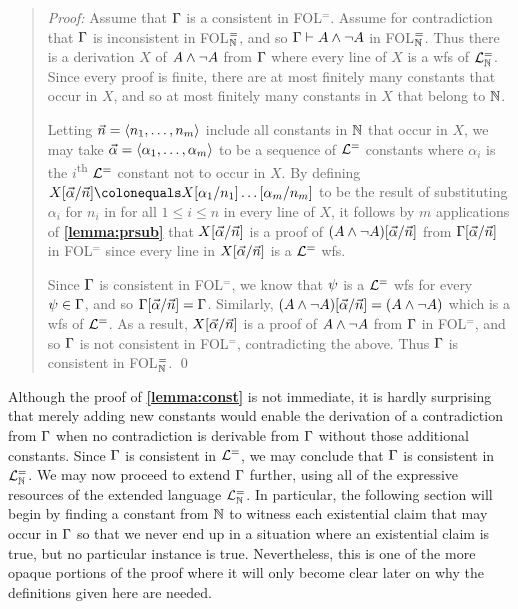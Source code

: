 \begin{quote} 
  \textit{Proof:} Assume that $\Gamma$ is a consistent in FOL$^=$.
  Assume for contradiction that $\Gamma$ is inconsistent in FOL$^=_{\mathbb{N}}$, and so $\Gamma\vdash A\wedge\neg A$ in FOL$^=_{\mathbb{N}}$.
  Thus there is a derivation $X$ of $A\wedge\neg A$ from $\Gamma$ where every line of $X$ is a wfs of $\mathcal{L}^{=}_{\mathbb{N}}$.
  Since every proof is finite, there are at most finitely many constants that occur in $X$, and so at most finitely many constants in $X$ that belong to $\mathbb{N}$.

  Letting $\vec{n}=\langle n_1,\ldots,n_m\rangle$ include all constants in $\mathbb{N}$ that occur in $X$, we may take $\vec{\alpha}=\langle\alpha_1,\ldots,\alpha_m\rangle$ to be a sequence of $\mathcal{L}^{=}$ constants where $\alpha_i$ is the $i$\textsuperscript{th} $\mathcal{L}^{=}$ constant not to occur in $X$.
  By defining $X\unisub{\vec{\alpha}}{\vec{n}}\colonequals X\unisub{\alpha_1}{n_1}\ldots\unisub{\alpha_m}{n_m}$ to be the result of substituting $\alpha_i$ for $n_i$ in for all $1\leq i\leq n$ in every line of $X$, it follows by $m$ applications of \textbf{\ref{lemma:prsub}} that $X[\vec{\alpha}/\vec{n}]$ is a proof of $(A\wedge\neg A)[\vec{\alpha}/\vec{n}]$ from $\Gamma[\vec{\alpha}/\vec{n}]$ in FOL$^=$ since every line in $X[\vec{\alpha}/\vec{n}]$ is a $\mathcal{L}^{=}$ wfs.

  Since $\Gamma$ is consistent in FOL$^=$, we know that $\psi$ is a $\mathcal{L}^{=}$ wfs for every $\psi\in\Gamma$, and so $\Gamma[\vec{\alpha}/\vec{n}]=\Gamma$.
  Similarly, $(A\wedge\neg A)[\vec{\alpha}/\vec{n}]=(A\wedge\neg A)$ which is a wfs of $\mathcal{L}^{=}$. 
  As a result, $X[\vec{\alpha}/\vec{n}]$ is a proof of $A\wedge\neg A$ from $\Gamma$ in FOL$^=$, and so $\Gamma$ is not consistent in FOL$^=$, contradicting the above.
  Thus $\Gamma$ is consistent in FOL$^=_{\mathbb{N}}$.
  \qed
\end{quote}

Although the proof of \textbf{\ref{lemma:const}} is not immediate, it is hardly surprising that merely adding new constants would enable the derivation of a contradiction from $\Gamma$ when no contradiction is derivable from $\Gamma$ without those additional constants.
Since $\Gamma$ is consistent in $\mathcal{L}^{=}$, we may conclude that $\Gamma$ is consistent in $\mathcal{L}^{=}_{\mathbb{N}}$.
We may now proceed to extend $\Gamma$ further, using all of the expressive resources of the extended language $\mathcal{L}^{=}_{\mathbb{N}}$. 
In particular, the following section will begin by finding a constant from $\mathbb{N}$ to witness each existential claim that may occur in $\Gamma$ so that we never end up in a situation where an existential claim is true, but no particular instance is true. 
Nevertheless, this is one of the more opaque portions of the proof where it will only become clear later on why the definitions given here are needed.





